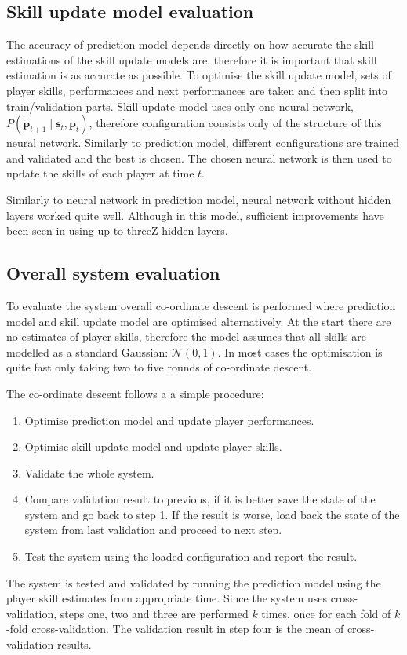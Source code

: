 \documentclass[12pt,a4paper]{book}
\newcommand\bs[1]{\boldsymbol{#1}}
\begin{document}
\subsection{Skill update model evaluation}
The accuracy of prediction model depends directly on how accurate the skill estimations of the skill update models are, therefore it is important that skill estimation is as accurate as possible.
To optimise the skill update model, sets of player skills, performances and next performances are taken and then split into train/validation parts.
Skill update model uses only one neural network, $P(\bs{p}_{t+1}\mid\bs{s}_t,\bs{p}_t)$, therefore configuration consists only of the structure of this neural network.
Similarly to prediction model, different configurations are trained and validated and the best is chosen.
The chosen neural network is then used to update the skills of each player at time $t$.

Similarly to neural network in prediction model, neural network without hidden layers worked quite well.
Although in this model, sufficient improvements have been seen in using up to threeZ hidden layers.

\subsection{Overall system evaluation}
To evaluate the system overall co-ordinate descent is performed where prediction model and skill update model are optimised alternatively.
At the start there are no estimates of player skills, therefore the model assumes that all skills are modelled as a standard Gaussian: $\mathcal{N}(0,1)$.
In most cases the optimisation is quite fast only taking two to five rounds of co-ordinate descent.

The co-ordinate descent follows a a simple procedure:
\begin{enumerate}
\item Optimise prediction model and update player performances.
\item Optimise skill update model and update player skills.
\item Validate the whole system.
\item Compare validation result to previous, if it is better save the state of the system and go back to step 1.
If the result is worse, load back the state of the system from last validation and proceed to next step.
\item Test the system using the loaded configuration and report the result.
\end{enumerate}
The system is tested and validated by running the prediction model using the player skill estimates from appropriate time.
Since the system uses cross-validation, steps one, two and three are performed $k$ times, once for each fold of $k$-fold cross-validation.
The validation result in step four is the mean of cross-validation results.
\end{document}
